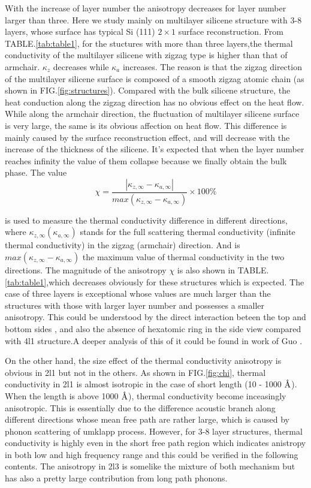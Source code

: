\documentclass[%
 reprint,
 amsmath,amssymb,
 aps,
 prb,
]{revtex4-1}
\newcommand{\angstrom}{\mbox{\normalfont\AA}}
\begin{document}
With the increase of layer number the anisotropy decreases for layer number larger than three. Here we study mainly on multilayer silicene structure with 3-8 layers, whose  surface has typical Si (111) $2 \times 1$ surface reconstruction.   From TABLE.\ref{tab:table1}, for the stuctures with more than three layers,the thermal conductivity of the multilayer silicene with zigzag type is higher than that of armchair. $\kappa_z$ decreases while $\kappa_a$ increases. The reason is that the zigzag direction of the multilayer silicene surface is composed of a smooth zigzag atomic chain (as shown in FIG.\ref{fig:structures}). Compared with the bulk silicene structure, the heat conduction along the zigzag direction has no obvious effect on the heat flow. While along the armchair direction, the fluctuation of multilayer silicene surface is very large, the same is its obvious affection on heat flow. This difference is mainly caused by the surface reconstruction effect, and will decrease with the increase of the thickness of the silicene. It's expected that when the layer number reaches infinity the value of them collapse because we finally obtain the bulk phase. The value
\begin{equation}
  \chi=\frac{|\kappa_{z,\infty}-\kappa_{a,\infty} |}{ max⁡(\kappa_{z,\infty}-\kappa_{a,\infty} ) } \times 100 \%  \label{eq:eq_chi}
\end{equation}

is used to measure the thermal conductivity difference in different directions, where $ \kappa_{z,\infty} (\kappa_{a,\infty})$ stands for the full scattering thermal conductivity (infinite thermal conductivity) in the zigzag (armchair) direction. And is $ max⁡(\kappa_{z,\infty}-\kappa_{a,\infty} ) $ the maximum value of thermal conductivity in the two directions. The magnitude of the anisotropy $\chi$ is also shown in TABLE.\ref{tab:table1},which  decreases obviously for these structures which is expected. The case of three layers is exceptional whose values are much larger than the structures with those with larger layer number and possesses a smaller anisotropy. This could be understood by the direct interaction beteen the top and bottom sides , and also the absence of hexatomic ring in the side view compared with 4l1 structure.A deeper analysis of this of it could be found in work of Guo \cite{Guo2015Structural}.


On the other hand, the size effect of the thermal conductivity anisotropy is obvious in 2l1 but not in the others. As shown in FIG.\ref{fig:chi}, thermal conductivity in 2l1 is almost isotropic  in the case of short length (10 - 1000 $\angstrom$). When the length is above 1000  $\angstrom$), thermal conductivity become inceasingly anisotropic. This is essentially due to the difference acoustic branch along different directions whose mean free path are rather large, which is caused by phonon scattering of umklapp process. However, for 3-8 layer structures, thermal conductivity is highly even in the short free path region which indicates anistropy in both low and high frequency range and this could  be verified in the following contents. The anisotropy in 2l3 is somelike the mixture of both mechanism but has also a pretty large contribution from long path phonons.
\end{document}
